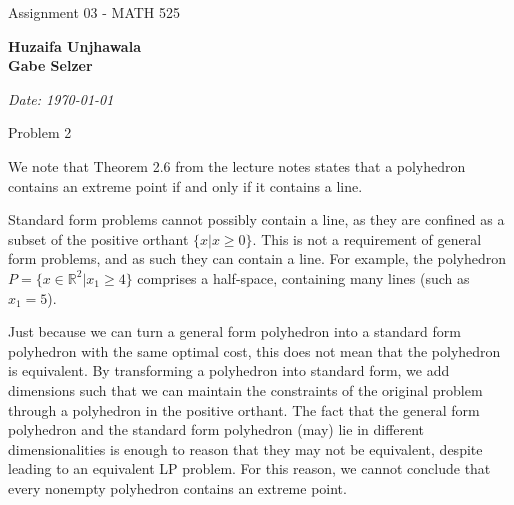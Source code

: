 \documentclass[11pt]{article}
\begin{document}
\begin{titlepage}
    \centering
    \vspace*{0.5cm}
    \par\normalfont\fontsize{35}{35}\sffamily\selectfont
    Assignment 03 - MATH 525\par 
    \vspace*{1cm}
    {\huge\bfseries Huzaifa Unjhawala \\  Gabe Selzer \par} 
    \vspace*{1cm}
    {\Large\itshape Date: \today\par} 
    \vfill
\end{titlepage}

\tableofcontents
\newpage

Problem 2

We note that Theorem 2.6 from the lecture notes states that a polyhedron contains an extreme point if and only if it contains a line.

Standard form problems cannot possibly contain a line, as they are confined as a subset of the positive orthant $\{x|x\geq 0\}$. This is not a requirement of general form problems, and as such they can contain a line. For example, the polyhedron $P=\{x\in\mathbb{R}^2|x_1\geq 4\}$ comprises a half-space, containing many lines (such as $x_1=5$).

Just because we can turn a general form polyhedron into a standard form polyhedron with the same optimal cost, this does not mean that the polyhedron is equivalent. By transforming a polyhedron into standard form, we add dimensions such that we can maintain the constraints of the original problem through a polyhedron in the positive orthant. The fact that the general form polyhedron and the standard form polyhedron (may) lie in different dimensionalities is enough to reason that they may not be equivalent, despite leading to an equivalent LP problem. For this reason, we cannot conclude that every nonempty polyhedron contains an extreme point.
\end{document}

